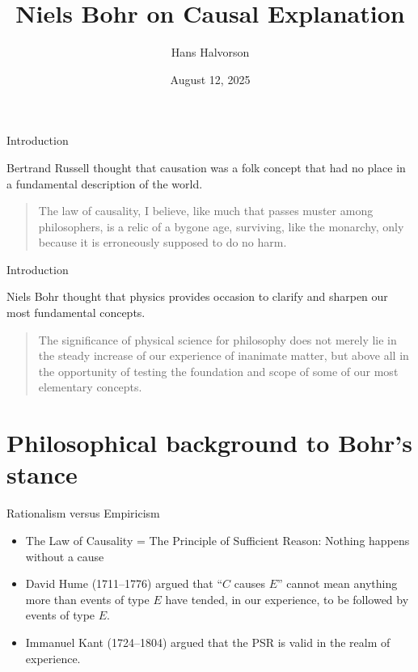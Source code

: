 \documentclass[fleqn]{beamer}
\title{Niels Bohr on Causal Explanation}
\subtitle{}
\author{Hans Halvorson}
\institute{Princeton University}
\date{August 12, 2025}
\begin{document}
\begin{frame}
   \titlepage
 \end{frame}

\begin{frame}{Introduction}

  Bertrand Russell thought that causation was a folk concept that had
  no place in a fundamental description of the world.

  \medskip \begin{quote} The law of causality, I believe, like much
    that passes muster among philosophers, is a relic of a bygone age,
    surviving, like the monarchy, only because it is erroneously
    supposed to do no harm. \citep[p 12]{russell1913} \end{quote}
    
\end{frame}

\begin{frame}{Introduction}

  Niels Bohr thought that physics provides occasion to clarify and
  sharpen our most fundamental concepts.

  \medskip \begin{quote} The significance of physical science for
    philosophy does not merely lie in the steady increase of our
    experience of inanimate matter, but above all in the opportunity
    of testing the foundation and scope of some of our most elementary
    concepts. \citep[p 308]{qphil1958} \end{quote}


\end{frame}

\section{Philosophical background to Bohr's stance}

\begin{frame}{Rationalism versus Empiricism}

  \begin{itemize}
  \item The Law of Causality = The Principle of Sufficient Reason:
    Nothing happens without a cause 
  \item David Hume (1711--1776) argued that ``$C$ causes $E$'' cannot
    mean anything more than events of type $E$ have tended, in our
    experience, to be followed by events of type $E$.
  \item Immanuel Kant (1724--1804) argued that the PSR is valid in the
    realm of experience.
  \end{itemize}

\end{frame}
\end{document}
